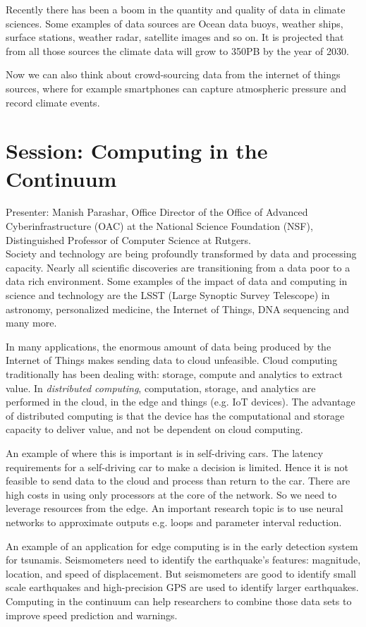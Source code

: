 \documentclass[9pt,a4paper]{article}
\begin{document}
Recently there has been a boom in the quantity and quality of data in climate sciences. 
Some examples of data sources are Ocean data buoys, weather ships, surface stations, weather radar, satellite images and so on. It is projected that from all those sources the climate data will grow to 350PB by the year of 2030. 

Now we can also think about crowd-sourcing data from the internet of things sources, where for example smartphones can capture atmospheric pressure and record climate events. 


\section*{Session: Computing  in the  Continuum}

Presenter: Manish Parashar, Office Director of the Office of Advanced Cyberinfrastructure (OAC) at the National Science Foundation (NSF), Distinguished Professor of Computer Science at Rutgers.\\

Society and technology are being profoundly transformed by data and processing capacity. 
Nearly all scientific discoveries are transitioning from a data poor to a data rich environment. 
Some examples of the impact of data and computing in science and technology are the LSST (Large Synoptic Survey Telescope) in astronomy, personalized medicine, the Internet of Things, DNA sequencing and many more.

In many applications, the enormous amount of data being produced by the Internet of Things makes sending data to cloud unfeasible. 
Cloud computing traditionally has been dealing with: storage, compute and analytics to extract value.
In \textit{distributed computing}, computation, storage, and analytics are performed in the cloud, in the edge and things (e.g. IoT devices).
The advantage of distributed computing is that the device has the computational and storage capacity to deliver value, and not be dependent on cloud computing. 

An example of where this is important is in self-driving cars.
The latency requirements for a self-driving car to make a decision is limited. 
Hence it is not feasible to send data to the cloud and process than return to the car.
There are high costs in using only processors at the core of the network. 
So we need to leverage resources from the edge. 
An important research topic is to use neural networks to approximate outputs e.g. loops and parameter interval reduction.

An example of an application for edge computing is in the early detection system for tsunamis. 
Seismometers need to identify the earthquake's features: magnitude, location, and speed of displacement.
But seismometers are good to identify small scale earthquakes and high-precision GPS are used to identify larger earthquakes.
Computing in the continuum can help researchers to combine those data sets to improve speed prediction and warnings.




\begin{footnotesize}

\end{footnotesize}
\end{document}
